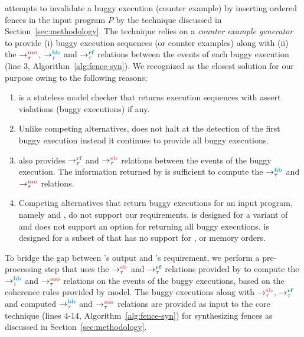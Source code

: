 \ourtechnique attempts to invalidate a buggy execution (\aka counter
example) by inserting \sc ordered fences in the input program $P$
by the technique discussed in Section~\ref{sec:methodology}.
%
The technique relies on a {\em counter example generator} to provide
(i) buggy execution sequences (or counter examples) along with (ii)
the $\setMO$, $\setHB$ and $\setRF$ relations between the events of 
each buggy execution (line 3, Algorithm~\ref{alg:fence-syn}).
%
We recognized \cds \cite{cds} as the closest solution for our purpose
owing to the following reasons;

\begin{enumerate}
	\item \cds is a stateless model checker that returns execution sequences 
		with assert violations (\aka buggy executions) if any.
	
	\item Unlike competing alternatives, \cds does not halt at the detection 
		of the first buggy execution instead it continues to provide all buggy 
		executions.
	
	\item \cds also provides $\setRF$ and $\setSB$ relations between the events 
		of the buggy execution. The information returned by \cds is sufficient
		to compute the $\setHB$ and $\setMO$ relations.
	
	\item Competing alternatives that return buggy executions for an input
		program, namely \genmc \cite{genmc-PLDI19} and \tracer \cite{tracer2018}, 
		do not support our requirements.
		\genmc is designed for a variant of \cc \cite{LahavVafeiadis-PLDI17} and
		does not support an option for returning all buggy executions. \tracer is
		designed for a subset of \cc that has no support for \sc, \na or \rel 
		memory orders. 
\end{enumerate}

To bridge the gap between \cds's output and \ourtechnique's requirement,
we perform a pre-processing step that uses the $\setSB$ and $\setRF$ relations 
provided by \cds to compute the $\setHB$ and $\setMO$ relations on the events
of the buggy executions, based on the coherence rules provided by \cc model.
%
The buggy executions along with $\setSB$, $\setRF$ and computed $\setHB$ 
and $\setMO$ relations are provided as input to the core technique 
(lines 4-14, Algorithm~\ref{alg:fence-syn}) for synthesizing fences as
discussed in Section~\ref{sec:methodology}.

